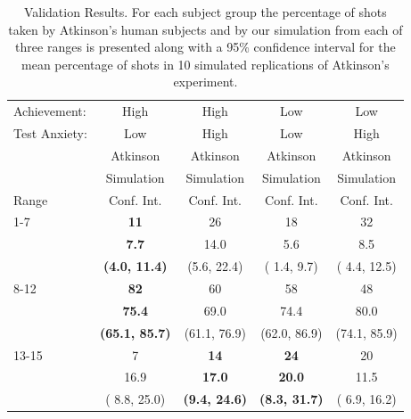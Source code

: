 \begin{table}[ht]
\caption{Validation Results.  For each subject group the percentage of shots taken by Atkinson's human subjects and by our simulation from each of three ranges is presented along with a 95\% confidence interval for the mean percentage of shots in 10 simulated replications of Atkinson's experiment.}

\begin{center}

\begin{tabular}{|l||c|c|c|c|} \hline
Achievement: & High & High & Low & Low \\
Test Anxiety: & Low & High & Low & High \\  \hline
 & Atkinson & Atkinson & Atkinson & Atkinson \\
 & Simulation & Simulation & Simulation & Simulation \\
Range & Conf. Int. & Conf. Int. & Conf. Int. & Conf. Int. \\ \hline\hline
  1-7 & \bf{11}           & 26              & 18           & 32 \\
      & \bf{7.7}          & 14.0            &  5.6         &  8.5 \\
      & \bf{(4.0, 11.4)}  & (5.6, 22.4)     & ( 1.4,  9.7) & ( 4.4, 12.5)\\ \hline
8-12  & \bf{82}           & 60               & 58           & 48 \\
      & \bf{75.4}         & 69.0             & 74.4         & 80.0 \\
      & \bf{(65.1, 85.7)} & (61.1, 76.9)     & (62.0, 86.9) & (74.1, 85.9)\\ \hline
13-15 & 7                 & \bf{14}           & \bf{24}           & 20 \\
      & 16.9              & \bf{17.0}         & \bf{20.0}         & 11.5 \\
      & ( 8.8, 25.0)      & \bf{(9.4, 24.6)}  & \bf{(8.3, 31.7)} & ( 6.9, 16.2)\\ \hline
\end{tabular}
\label{tab:results}

\end{center}
\end{table}

